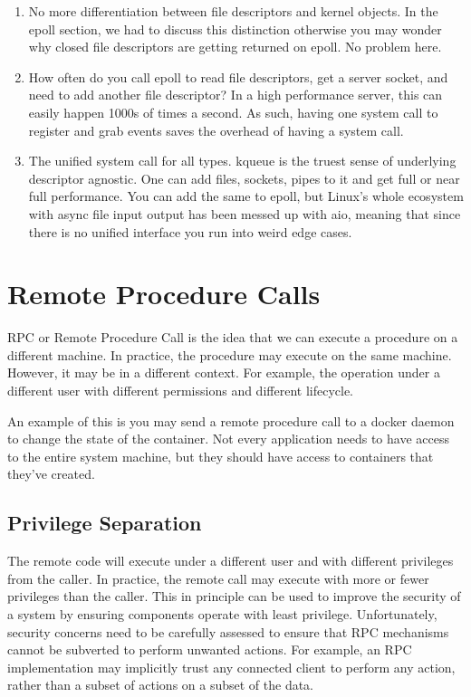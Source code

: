 \begin{enumerate}
\item No more differentiation between file descriptors and kernel objects. In the epoll section, we had to discuss this distinction otherwise you may wonder why closed file descriptors are getting returned on epoll. No problem here.
\item How often do you call epoll to read file descriptors, get a server socket, and need to add another file descriptor?
  In a high performance server, this can easily happen 1000s of times a second.
  As such, having one system call to register and grab events saves the overhead of having a system call.
\item The unified system call for all types.
  kqueue is the truest sense of underlying descriptor agnostic.
  One can add files, sockets, pipes to it and get full or near full performance.
  You can add the same to epoll, but Linux's whole ecosystem with async file input output has been messed up with aio, meaning that since there is no unified interface you run into weird edge cases.

\end{enumerate}


\section{Remote Procedure Calls}

RPC or Remote Procedure Call is the idea that we can execute a procedure on a different machine.
In practice, the procedure may execute on the same machine.
However, it may be in a different context.
For example, the operation under a different user with different permissions and different lifecycle.

An example of this is you may send a remote procedure call to a docker daemon to change the state of the container.
Not every application needs to have access to the entire system machine, but they should have access to containers that they've created.

\subsection{Privilege Separation}

The remote code will execute under a different user and with different privileges from the caller.
In practice, the remote call may execute with more or fewer privileges than the caller.
This in principle can be used to improve the security of a system by ensuring components operate with least privilege.
Unfortunately, security concerns need to be carefully assessed to ensure that RPC mechanisms cannot be subverted to perform unwanted actions.
For example, an RPC implementation may implicitly trust any connected client to perform any action, rather than a subset of actions on a subset of the data.

